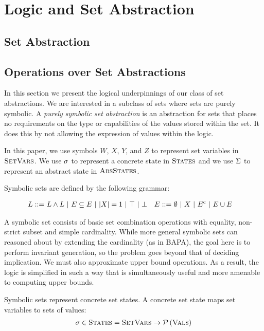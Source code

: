 \section{Logic and Set Abstraction}
\label{sec:logic-and-set-abstraction}

\subsection{Set Abstraction}

\subsection{Operations over Set Abstractions}
\label{s:3:2:sign}

In this section we present the logical underpinnings of our class of set abstractions.  We are interested in a subclass of sets where sets are purely symbolic.  A \emph{purely symbolic set abstraction} is an abstraction for sets that places no requirements on the type or capabilities of the values stored within the set.  It does this by not allowing the expression of values within the logic.

In this paper, we use symbols $W$, $X$, $Y$, and $Z$ to represent set variables in $\textsc{SetVars}$.  We use $\sigma$ to represent a concrete state in $\textsc{States}$ and we use $\Sigma$ to represent an abstract state in $\textsc{AbsStates}$.
\begin{definition}
    Symbolic sets are defined by the following grammar:
    
    \begin{align*}
        L ::= & \ L \wedge L \ | \ E \subseteq E \ | \ |{X}| = 1 \ | \ \top \ | \ \bot &
        E ::= & \ \emptyset \ | \ X \ | \ {E}^{\mathrm{c}} \ | \ E \cup E
    \end{align*}
\end{definition}

A symbolic set consists of basic set combination operations with equality, non-strict subset and simple cardinality.  While more general symbolic sets can reasoned about by extending the cardinality (as in BAPA), the goal here is to perform invariant generation, so the problem goes beyond that of deciding implication.  We must also approximate upper bound operations.  As a result, the logic is simplified in such a way that is simultaneously useful and more amenable to computing upper bounds.

Symbolic sets represent concrete set states.  A concrete set state maps set variables to sets of values:
\begin{align*}
    \sigma \in \textsc{States} = \textsc{SetVars} \rightarrow \mathcal{P}\left({\textsc{Vals}}\right)
\end{align*}

